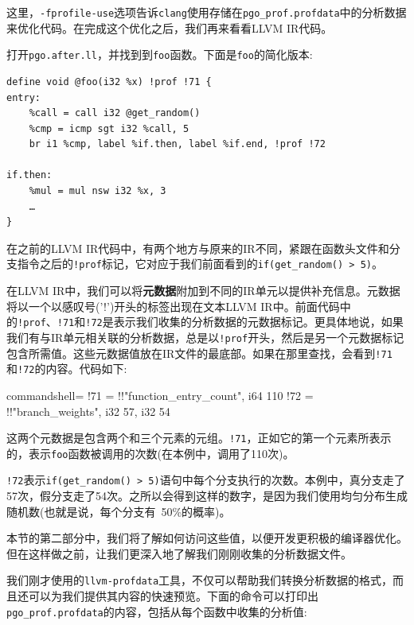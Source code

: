 这里，\texttt{-fprofile-use}选项告诉\texttt{clang}使用存储在\texttt{pgo\_prof.profdata}中的分析数据来优化代码。在完成这个优化之后，我们再来看看LLVM IR代码。

打开\texttt{pgo.after.ll}，并找到到\texttt{foo}函数。下面是\texttt{foo}的简化版本:

\begin{lstlisting}[style=styleCXX]
define void @foo(i32 %x) !prof !71 {
entry:
	%call = call i32 @get_random()
	%cmp = icmp sgt i32 %call, 5
	br i1 %cmp, label %if.then, label %if.end, !prof !72
	
if.then:
	%mul = mul nsw i32 %x, 3
	…
}
\end{lstlisting}

在之前的LLVM IR代码中，有两个地方与原来的IR不同，紧跟在函数头文件和分支指令之后的\texttt{!prof}标记，它对应于我们前面看到的\texttt{if(get\_random() > 5)}。

在LLVM IR中，我们可以将\textbf{元数据}附加到不同的IR单元以提供补充信息。元数据将以一个以感叹号('!')开头的标签出现在文本LLVM IR中。前面代码中的\texttt{!prof}、\texttt{!71}和\texttt{!72}是表示我们收集的分析数据的元数据标记。更具体地说，如果我们有与IR单元相关联的分析数据，总是以\texttt{!prof}开头，然后是另一个元数据标记包含所需值。这些元数据值放在IR文件的最底部。如果在那里查找，会看到\texttt{!71}和\texttt{!72}的内容。代码如下:

\begin{tcblisting}{commandshell={}}
!71 = !{!"function_entry_count", i64 110}
!72 = !{!"branch_weights", i32 57, i32 54}
\end{tcblisting}

这两个元数据是包含两个和三个元素的元组。\texttt{!71}，正如它的第一个元素所表示的，表示\texttt{foo}函数被调用的次数(在本例中，调用了110次)。

\texttt{!72}表示\texttt{if(get\_random() > 5)}语句中每个分支执行的次数。本例中，真分支走了57次，假分支走了54次。之所以会得到这样的数字，是因为我们使用均匀分布生成随机数(也就是说，每个分支有~50\%的概率)。

本节的第二部分中，我们将了解如何访问这些值，以便开发更积极的编译器优化。但在这样做之前，让我们更深入地了解我们刚刚收集的分析数据文件。

我们刚才使用的\texttt{llvm-profdata}工具，不仅可以帮助我们转换分析数据的格式，而且还可以为我们提供其内容的快速预览。下面的命令可以打印出\texttt{pgo\_prof.profdata}的内容，包括从每个函数中收集的分析值:


